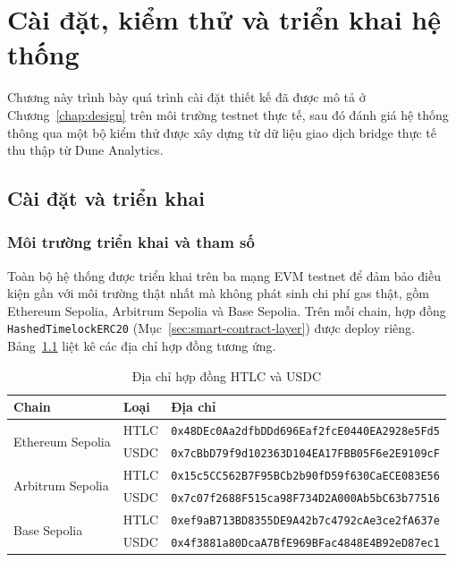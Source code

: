 \chapter{Cài đặt, kiểm thử và triển khai hệ thống}
\label{chap:implementation}

Chương này trình bày quá trình cài đặt thiết kế đã được mô tả ở Chương~\ref{chap:design}
trên môi trường testnet thực tế, sau đó đánh giá hệ thống thông qua một bộ kiểm thử
được xây dựng từ dữ liệu giao dịch bridge thực tế thu thập từ Dune Analytics.

\section{Cài đặt và triển khai}
\label{sec:c4-implementation}

\subsection{Môi trường triển khai và tham số}

Toàn bộ hệ thống được triển khai trên ba mạng EVM testnet để đảm bảo điều kiện gần với
môi trường thật nhất mà không phát sinh chi phí gas thật, gồm Ethereum Sepolia, Arbitrum
Sepolia và Base Sepolia. Trên mỗi chain, hợp đồng \texttt{HashedTimelockERC20}
(Mục~\ref{sec:smart-contract-layer}) được deploy riêng. 
Bảng~\ref{tab:c4-contracts} liệt kê các địa chỉ hợp đồng tương ứng.

\begin{table}[H]
    \centering
    \caption{Địa chỉ hợp đồng HTLC và USDC}
    \label{tab:c4-contracts}
    \footnotesize
    \begin{tabular}{|l|l|l|}
        \hline
        \textbf{Chain} & \textbf{Loại} & \textbf{Địa chỉ} \\
        \hline
        \multirow{2}{*}{Ethereum Sepolia} & HTLC & \texttt{0x48DEc0Aa2dfbDDd696Eaf2fcE0440EA2928e5Fd5} \\
        \cline{2-3}
                                          & USDC & \texttt{0x7cBbD79f9d102363D104EA17FBB05F6e2E9109cF} \\
        \hline
        \multirow{2}{*}{Arbitrum Sepolia} & HTLC & \texttt{0x15c5CC562B7F95BCb2b90fD59f630CaECE083E56} \\
        \cline{2-3}
                                          & USDC & \texttt{0x7c07f2688F515ca98F734D2A000Ab5bC63b77516} \\
        \hline
        \multirow{2}{*}{Base Sepolia}     & HTLC & \texttt{0xef9aB713BD8355DE9A42b7c4792cAe3ce2fA637e} \\
        \cline{2-3}
                                          & USDC & \texttt{0x4f3881a80DcaA7BfE969BFac4848E4B92eD87ec1} \\
        \hline
    \end{tabular}
\end{table}

